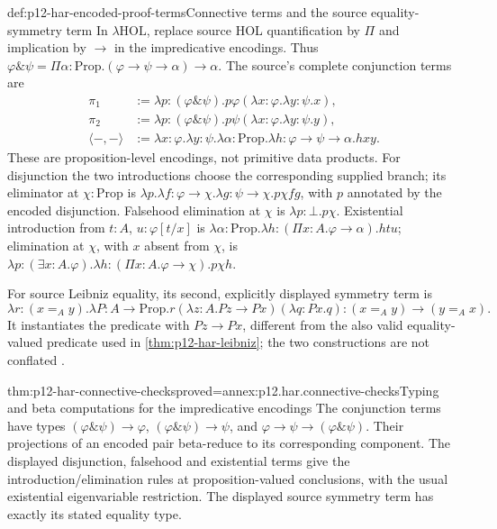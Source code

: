 \begin{hbexample}{def:p12-har-encoded-proof-terms}{Connective terms and the source equality-symmetry term}
In \(\lambda\mathrm{HOL}\), replace source HOL quantification by
\(\Pi\) and implication by \(\to\) in the impredicative encodings.
Thus \(\varphi\mathbin{\&}\psi=
\Pi\alpha:\mathrm{Prop}.(\varphi\to\psi\to\alpha)\to\alpha\).
The source's complete conjunction terms are
\[
\begin{aligned}
 \pi_1&:=\lambda p:(\varphi\mathbin{\&}\psi).
       p\varphi(\lambda x:\varphi.\lambda y:\psi.x),\\
 \pi_2&:=\lambda p:(\varphi\mathbin{\&}\psi).
       p\psi(\lambda x:\varphi.\lambda y:\psi.y),\\
 \langle-,-\rangle&:=\lambda x:\varphi.\lambda y:\psi.
       \lambda\alpha:\mathrm{Prop}.
       \lambda h:\varphi\to\psi\to\alpha.hxy.
\end{aligned}
\]
These are proposition-level encodings, not primitive data products.
For disjunction the two introductions choose the corresponding supplied
branch; its eliminator at \(\chi:\mathrm{Prop}\) is
\(\lambda p.\lambda f:\varphi\to\chi.
\lambda g:\psi\to\chi.p\chi f g\), with \(p\) annotated
by the encoded disjunction. Falsehood elimination at \(\chi\) is
\(\lambda p:\bot.p\chi\). Existential introduction from
\(t:A\), \(u:\varphi[t/x]\) is
\(\lambda\alpha:\mathrm{Prop}.
\lambda h:(\Pi x:A.\varphi\to\alpha).htu\);
elimination at \(\chi\), with \(x\) absent from \(\chi\), is
\(\lambda p:(\exists x:A.\varphi).
\lambda h:(\Pi x:A.\varphi\to\chi).p\chi h\).

For source Leibniz equality, its second, explicitly displayed symmetry
term is
\[
 \lambda r:(x=_A y).\lambda P:A\to\mathrm{Prop}.
   r(\lambda z:A.Pz\to Px)(\lambda q:Px.q)
       :(x=_A y)\to(y=_A x).
\]
It instantiates the predicate with \(Pz\to Px\), different from
the also valid equality-valued predicate used in
\cref{thm:p12-har-leibniz}; the two constructions are not conflated
\cite[pp.~1187--1189, Examples~3.10 and connective discussion]{BarendregtGeuvers2001}.
\end{hbexample}

\begin{hbtheorem}{thm:p12-har-connective-checks}{proved=annex:p12.har.connective-checks}{Typing and beta computations for the impredicative encodings}
The conjunction terms have types
\((\varphi\mathbin{\&}\psi)\to\varphi\),
\((\varphi\mathbin{\&}\psi)\to\psi\), and
\(\varphi\to\psi\to(\varphi\mathbin{\&}\psi)\).
Their projections of an encoded pair beta-reduce to its corresponding
component. The displayed disjunction, falsehood and existential terms
give the introduction/elimination rules at proposition-valued conclusions,
with the usual existential eigenvariable restriction. The displayed
source symmetry term has exactly its stated equality type.
\end{hbtheorem}

